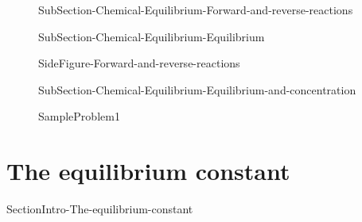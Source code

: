 \documentclass[main.tex]{subfiles}
\begin{document}
\sloppy\begin{description}

\item[] {SubSection-Chemical-Equilibrium-Forward-and-reverse-reactions}




\item[] {SubSection-Chemical-Equilibrium-Equilibrium}




{SideFigure-Forward-and-reverse-reactions}




\item[] {SubSection-Chemical-Equilibrium-Equilibrium-and-concentration}



  {SampleProblem1}






\end{description}

 
\section{{The equilibrium constant}}   {SectionIntro-The-equilibrium-constant}
\end{document}
